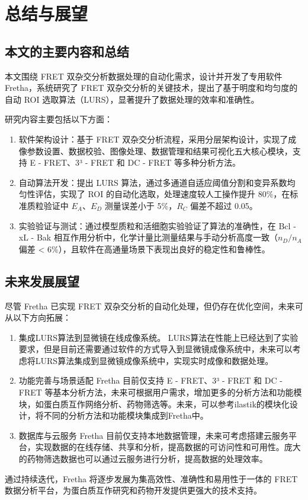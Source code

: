 \chapter{总结与展望}

\section{本文的主要内容和总结}
本文围绕 FRET 双杂交分析数据处理的自动化需求，设计并开发了专用软件 Fretha，系统研究了 FRET 双杂交分析的关键技术，提出了基于明度和均匀度的自动 ROI 选取算法（LURS），显著提升了数据处理的效率和准确性。

研究内容主要包括以下方面：
\begin{enumerate}
    \item 软件架构设计：基于 FRET 双杂交分析流程，采用分层架构设计，实现了成像参数设置、数据校验、图像处理、数据管理和结果可视化五大核心模块，支持 E - FRET、3³ - FRET 和 DC - FRET 等多种分析方法。
    \item 自动算法开发：提出 LURS 算法，通过多通道自适应阈值分割和变异系数均匀性评估，实现了 ROI 的自动化选取，处理速度较人工操作提升 80\%，在标准质粒验证中 $E_{A}$、$E_{D}$ 测量误差小于 5\%，$R_{C}$ 偏差不超过 0.05。
    \item 实验验证与测试：通过模型质粒和活细胞实验验证了算法的准确性，在 Bcl - xL - Bak 相互作用分析中，化学计量比测量结果与手动分析高度一致（$n_{D}/n_{A}$ 偏差 < 6\%），且软件在高通量场景下表现出良好的稳定性和鲁棒性。
\end{enumerate}

\section{未来发展展望}
尽管 Fretha 已实现 FRET 双杂交分析的自动化处理，但仍存在优化空间，未来可从以下方向拓展：
\begin{enumerate}
    \item 集成LURS算法到显微镜在线成像系统。
    LURS算法在性能上已经达到了实验要求，但是目前还需要通过软件的方式导入到显微镜成像系统中，未来可以考虑将LURS算法集成到显微镜成像系统中，实现实时成像和数据处理。
    \item 功能完善与场景适配
    Fretha 目前仅支持 E - FRET、3³ - FRET 和 DC - FRET 等基本分析方法，未来可根据用户需求，增加更多的分析方法和功能模块，如蛋白质互作网络分析、药物筛选等。未来，可以参考ilastik的模块化设计，将不同的分析方法和功能模块集成到Fretha中。
    \item 数据库与云服务
    Fretha 目前仅支持本地数据管理，未来可考虑搭建云服务平台，实现数据的在线存储、共享和分析，提高数据的可访问性和可用性。庞大的药物筛选数据也可以通过云服务进行分析，提高数据的处理效率。
\end{enumerate}

通过持续迭代，Fretha 将逐步发展为集高效性、准确性和易用性于一体的 FRET 数据分析平台，为蛋白质互作研究和药物开发提供更强大的技术支持。